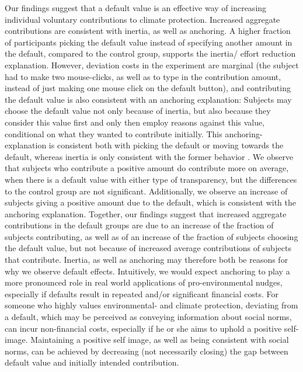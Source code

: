 \documentclass[review, authoryear,12pt]{elsarticle}
\begin{document}
Our findings suggest that a default value is an effective way of increasing individual voluntary contributions to climate protection. Increased aggregate contributions are consistent with inertia, as well as anchoring. A higher fraction of participants picking the default value instead of specifying another amount in the default, compared to the control group, supports the inertia/ effort reduction explanation. However, deviation costs in the experiment are marginal (the subject had to make two mouse-clicks, as well as to type in the contribution amount, instead of just making one mouse click on the default button), and contributing the default value is also consistent with an anchoring explanation: Subjects may choose the default value not only because of inertia, but also because they consider this value first and only then employ reasons against this value, conditional on what they wanted to contribute initially. This anchoring-explanation is consistent both with picking the default or moving towards the default, whereas inertia is only consistent with the former behavior \citep{Dhingra.2012}. We observe that subjects who contribute a positive amount do contribute more on average, when there is a default value with either type of transparency, but the differences to the control group are not significant. Additionally, we observe an increase of subjects giving a positive amount due to the default, which is consistent with the anchoring explanation. Together, our findings suggest that increased aggregate contributions in the default groups are due to an increase of the fraction of subjects contributing, as well as of an increase of the fraction of subjects choosing the default value, but not because of increased average contributions of subjects that contribute. Inertia, as well as anchoring may therefore both be reasons for why we observe default effects. Intuitively, we would expect anchoring to play a more pronounced role in real world applications of pro-environmental nudges, especially if defaults result in repeated and/or significant financial costs. For someone who highly values environmental- and climate protection, deviating from a default, which may be perceived as conveying information about social norms, can incur non-financial costs, especially if he or she aims to uphold a positive self-image. Maintaining a positive self image, as well as being consistent with social norms, can be achieved by decreasing (not necessarily closing) the gap between default value and initially intended contribution. 
\end{document}
